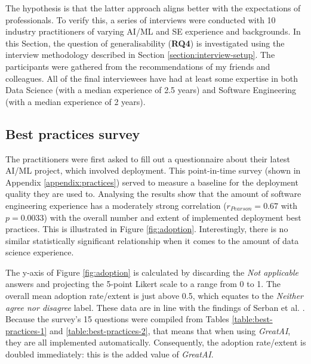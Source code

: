 The hypothesis is that the latter approach aligns better with the expectations of professionals. To verify this, a series of interviews were conducted with 10 industry practitioners of varying AI/ML and SE experience and backgrounds. In this Section, the question of generalisability (\textbf{RQ4}) is investigated using the interview methodology described in Section \ref{section:interview-setup}. The participants were gathered from the recommendations of my friends and colleagues. All of the final interviewees have had at least some expertise in both Data Science (with a median experience of 2.5 years) and Software Engineering (with a median experience of 2 years).

\subsection{Best practices survey}

The practitioners were first asked to fill out a questionnaire about their latest AI/ML project, which involved deployment. This point-in-time survey (shown in Appendix \ref{appendix:practices}) served to measure a baseline for the deployment quality they are used to. Analysing the results show that the amount of software engineering experience has a moderately strong correlation ($r_{Pearson} = 0.67$ with $p = 0.0033$) with the overall number and extent of implemented deployment best practices. This is illustrated in Figure \ref{fig:adoption}. Interestingly, there is no similar statistically significant relationship when it comes to the amount of data science experience. 

The y-axis of Figure \ref{fig:adoption} is calculated by discarding the \textit{Not applicable} answers and projecting the 5-point Likert scale to a range from 0 to 1. The overall mean adoption rate/extent is just above 0.5, which equates to the \textit{Neither agree nor disagree} label. These data are in line with the findings of Serban et al. \cite{serban2020adoption}. Because the survey's 15 questions were compiled from Tables \ref{table:best-practices-1} and \ref{table:best-practices-2}, that means that when using \textit{GreatAI}, they are all implemented automatically. Consequently, the adoption rate/extent is doubled immediately: this is the added value of \textit{GreatAI}.

